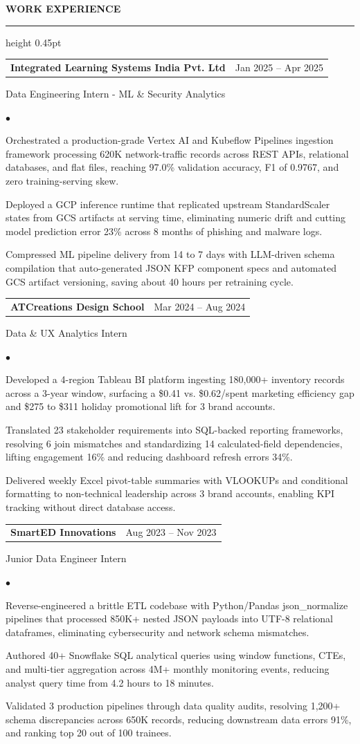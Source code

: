 \documentclass[10pt,letterpaper]{article}
\makeatletter
\newcommand{\ressection}[1]{%
  \vspace{2.5pt}
  {\color{sectionblue}\bfseries\MakeUppercase{#1}}\par
  \vspace{1pt}
  {\color{sectionblue}\hrule height 0.45pt}
  \vspace{2pt}
}
\newenvironment{reslist}{%
  \begin{list}{$\bullet$}{%
    \setlength{\leftmargin}{1.05em}
    \setlength{\itemsep}{0.45pt}
    \setlength{\parsep}{0pt}
    \setlength{\topsep}{1pt}
    \setlength{\partopsep}{0pt}
  }
}{\end{list}}
\newcommand{\role}[3]{%
  \begin{tabularx}{\textwidth}{@{}Xr@{}}
    \textbf{#1} & #2 \\
  \end{tabularx}
  #3\par
}
\makeatother
\begin{document}
\ressection{Work Experience}
\role{Integrated Learning Systems India Pvt. Ltd}{Jan 2025 -- Apr 2025}{Data Engineering Intern - ML \& Security Analytics}
\begin{reslist}
  \item Orchestrated a production-grade Vertex AI and Kubeflow Pipelines ingestion framework processing 620K network-traffic records across REST APIs, relational databases, and flat files, reaching 97.0\% validation accuracy, F1 of 0.9767, and zero training-serving skew.
  \item Deployed a GCP inference runtime that replicated upstream StandardScaler states from GCS artifacts at serving time, eliminating numeric drift and cutting model prediction error 23\% across 8 months of phishing and malware logs.
  \item Compressed ML pipeline delivery from 14 to 7 days with LLM-driven schema compilation that auto-generated JSON KFP component specs and automated GCS artifact versioning, saving about 40 hours per retraining cycle.
\end{reslist}

\role{ATCreations Design School}{Mar 2024 -- Aug 2024}{Data \& UX Analytics Intern}
\begin{reslist}
  \item Developed a 4-region Tableau BI platform ingesting 180,000+ inventory records across a 3-year window, surfacing a \$0.41 vs. \$0.62/spent marketing efficiency gap and \$275 to \$311 holiday promotional lift for 3 brand accounts.
  \item Translated 23 stakeholder requirements into SQL-backed reporting frameworks, resolving 6 join mismatches and standardizing 14 calculated-field dependencies, lifting engagement 16\% and reducing dashboard refresh errors 34\%.
  \item Delivered weekly Excel pivot-table summaries with VLOOKUPs and conditional formatting to non-technical leadership across 3 brand accounts, enabling KPI tracking without direct database access.
\end{reslist}

\role{SmartED Innovations}{Aug 2023 -- Nov 2023}{Junior Data Engineer Intern}
\begin{reslist}
  \item Reverse-engineered a brittle ETL codebase with Python/Pandas json\_normalize pipelines that processed 850K+ nested JSON payloads into UTF-8 relational dataframes, eliminating cybersecurity and network schema mismatches.
  \item Authored 40+ Snowflake SQL analytical queries using window functions, CTEs, and multi-tier aggregation across 4M+ monthly monitoring events, reducing analyst query time from 4.2 hours to 18 minutes.
  \item Validated 3 production pipelines through data quality audits, resolving 1,200+ schema discrepancies across 650K records, reducing downstream data errors 91\%, and ranking top 20 out of 100 trainees.
\end{reslist}
\end{document}
